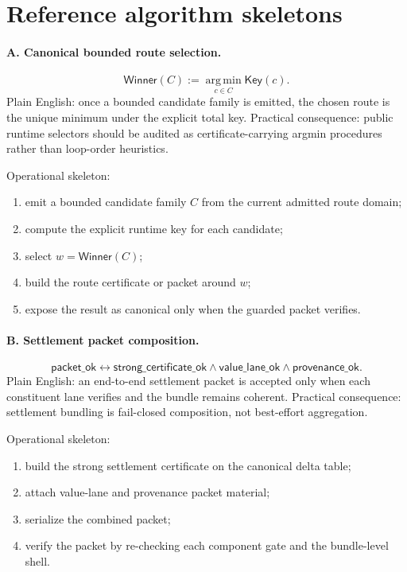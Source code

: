 \documentclass[9pt]{extarticle}
\newcommand{\Key}{\mathsf{Key}}
\newcommand{\Winner}{\mathsf{Winner}}
\newcommand{\argmin}{\operatorname*{arg\,min}}
\begin{document}
\section{Reference algorithm skeletons}
\paragraph{A. Canonical bounded route selection.}
\[
\Winner(C) := \argmin_{c \in C} \Key(c).
\]
Plain English: once a bounded candidate family is emitted, the chosen route
is the unique minimum under the explicit total key.
Practical consequence: public runtime selectors should be audited as
certificate-carrying argmin procedures rather than loop-order heuristics.

Operational skeleton:
\begin{enumerate}
  \item emit a bounded candidate family $C$ from the current admitted route domain;
  \item compute the explicit runtime key for each candidate;
  \item select $w = \Winner(C)$;
  \item build the route certificate or packet around $w$;
  \item expose the result as canonical only when the guarded packet verifies.
\end{enumerate}

\paragraph{B. Settlement packet composition.}
\[
\mathsf{packet\_ok} \leftrightarrow \mathsf{strong\_certificate\_ok} \wedge \mathsf{value\_lane\_ok} \wedge \mathsf{provenance\_ok}.
\]
Plain English: an end-to-end settlement packet is accepted only when each
constituent lane verifies and the bundle remains coherent.
Practical consequence: settlement bundling is fail-closed composition, not
best-effort aggregation.

Operational skeleton:
\begin{enumerate}
  \item build the strong settlement certificate on the canonical delta table;
  \item attach value-lane and provenance packet material;
  \item serialize the combined packet;
  \item verify the packet by re-checking each component gate and the bundle-level shell.
\end{enumerate}
\end{document}
